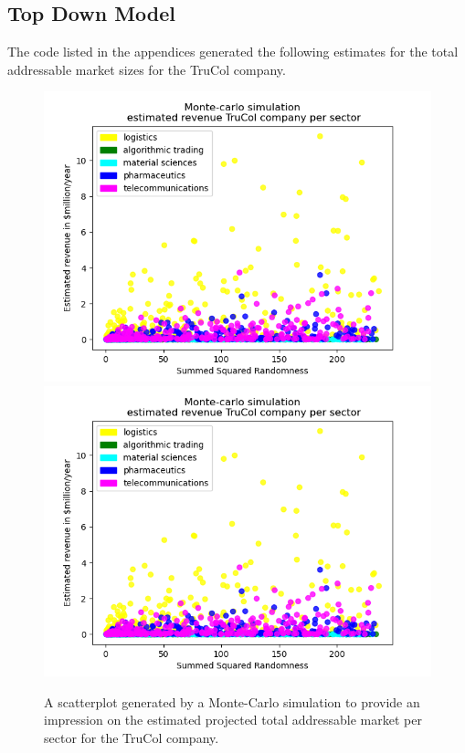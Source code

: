 \subsection{Top Down Model}\label{subsec:results_top_down}
The code listed in the appendices generated the following estimates for the total addressable market sizes for the TruCol company.
\begin{figure}[H]
    \centering
    \ifx\homepath\overleafhome
		\includegraphics[width=0.5\linewidth]{Images/revenue_per_sector.png}
	\else
    \includegraphics[width=0.5\linewidth]{latex/Images/revenue_per_sector.png}
	\fi

    \caption{A scatterplot generated by a Monte-Carlo simulation to provide an impression on the estimated projected total addressable market per sector for the TruCol company.}
    \label{fig:per_sector}
\end{figure}

